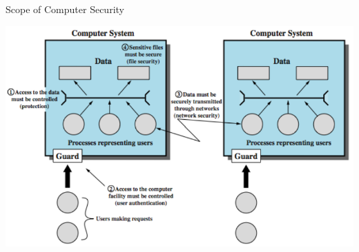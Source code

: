 \documentclass{beamer}
\begin{document}

\begin{frame}{Scope of Computer Security}
  \begin{center}
    \includegraphics[width=0.8\linewidth]{securityScope}
  \end{center}
\end{frame}
\end{document}
